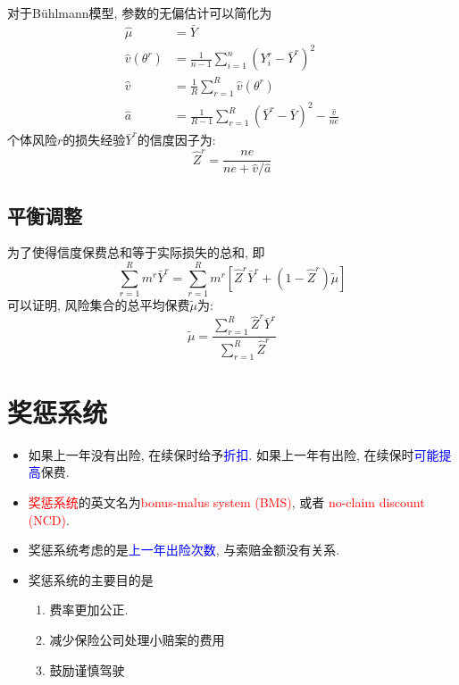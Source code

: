 \documentclass[professionalfont]{beamer}
\newcommand{\red}[1]{\textcolor{red}{#1}}
\newcommand{\blue}[1]{\textcolor{blue}{#1}}
\begin{document}
\begin{frame}
对于B\"uhlmann模型, 参数的无偏估计可以简化为
\begin{equation*}
\begin{aligned}
\hat{\mu}&=\bar{Y}\\
\hat{v}(\theta^r)&=\frac{1}{n-1}\sum_{i=1}^{n}(Y_i^r-\bar{Y}^r)^2\\
\hat{v}&=\frac{1}{R}\sum_{r=1}^R\hat{v}(\theta^r)\\
\hat{a}&=\frac{1}{R-1}\sum_{r=1}^R(\bar{Y}^r-\bar{Y})^2-\frac{\hat{v}}{ne}
\end{aligned}
\end{equation*}
个体风险$r$的损失经验$\bar{Y}^r$的信度因子为:
$$\hat{Z}^r=\frac{ne}{ne+\hat{v}/\hat{a}}$$
\end{frame}

\subsection{平衡调整}
\begin{frame}
为了使得信度保费总和等于实际损失的总和, 即
\begin{equation}
\sum_{r=1}^Rm^r\bar{Y}^r=\sum_{r=1}^R m^r\left[\hat{Z}^r\bar{Y}^r+(1-\hat{Z}^r)\tilde{\mu}\right]
\end{equation}
可以证明, 风险集合的总平均保费$\tilde{\mu}$为:
\begin{equation}\label{balance}
\tilde{\mu}=\frac{\sum_{r=1}^{R}\hat{Z}^r\bar{Y}^r}{\sum_{r=1}^{R}\hat{Z}^r}
\end{equation}
\end{frame}
\section{奖惩系统}
\begin{frame}
\begin{itemize}
\item 如果上一年没有出险, 在续保时给予\blue{折扣}. 如果上一年有出险, 在续保时\blue{可能提高}保费.
\item \red{奖惩系统}的英文名为\red{bonus-malus system (BMS)}, 或者 \red{no-claim discount (NCD)}.
\item 奖惩系统考虑的是\blue{上一年出险次数}, 与索赔金额没有关系.
\item 奖惩系统的主要目的是 
\begin{enumerate}
\item 费率更加公正.
\item 减少保险公司处理小赔案的费用
\item 鼓励谨慎驾驶
\end{enumerate}
\end{itemize}
\end{frame}
\end{document}
